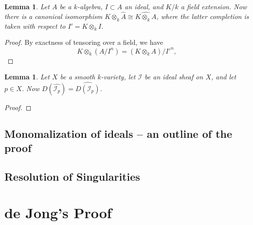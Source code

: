 \documentclass[12pt,a4paper,leqno]{article}
\theoremstyle{plain}
\newtheorem{lem}[theo]{Lemma}
\theoremstyle{definition}
\theoremstyle{remark}
\begin{document}
\begin{lem}
Let $A$ be a $k$-algebra, $I \subset A$ an ideal, and $K/k$ a field extension. Now there is a canonical isomorphism $K \otimes_k \widehat{A} \cong \widehat{K \otimes_k A}$, where the latter completion is taken with respect to $I' = K \otimes_k I$.
\end{lem}
\begin{proof}
By exactness of tensoring over a field, we have
\begin{equation*}
K \otimes_k (A/I^n) = (K \otimes_k A)/I'^n,
\end{equation*}
\end{proof}

\begin{lem}
Let $X$ be a smooth $k$-variety, let $\mathscr{I}$ be an ideal sheaf on $X$, and let $p \in X$. Now $D(\widehat{\mathscr{I}_p}) = \widehat{D(\mathscr{I}_p)}$.
\end{lem}
\begin{proof}

\end{proof}

\subsection{Monomalization of ideals -- an outline of the proof}

\subsection{Resolution of Singularities}

\section{de Jong's Proof}\label{deJongRes}
\end{document}
